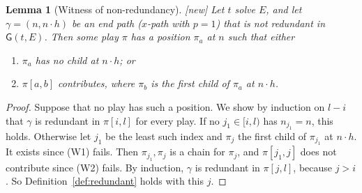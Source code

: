 \documentclass[11pt]{article}
\newcommand{\Gm}{\mathsf{G}}
\newcommand{\suc}[2]{#1{\cdot}#2}
\newcommand{\iv}[2]{\pi[#1,#2]}
\newcommand{\New}{\textsf{[new]}}
\theoremstyle{plain}
\newtheorem{lemma}[theorem]{Lemma}
\theoremstyle{definition}
\theoremstyle{remark}
\begin{document}
\begin{lemma}[Witness of non-redundancy]\label{lem:witness}
\New{} Let $t$ solve $E$, and let $\gamma=(n,\suc nh)$ be an end path
($x$-path with $p=1$) that is not redundant in $\Gm(t,E)$.  Then some
play $\pi$ has a position $\pi_a$ at $n$ such that either
\begin{enumerate}[(W1)]
\item $\pi_a$ has no child at $\suc nh$; or
\item $\iv ab$ contributes, where $\pi_b$ is the first child of
  $\pi_a$ at $\suc nh$.
\end{enumerate}
\end{lemma}
\begin{proof}
Suppose that no play has such a position.  We show by induction on
$l-i$ that $\gamma$ is redundant in $\iv il$ for every play.  If no
$j_1\in[i,l)$ has $n_{j_1}=n$, this holds.  Otherwise let $j_1$ be the
least such index and $\pi_j$ the first child of $\pi_{j_1}$ at $\suc nh$.
It exists since (W1) fails.  Then $\pi_{j_1},\pi_j$ is a chain for
$\pi_j$, and $\iv{j_1}j$ does not contribute since (W2) fails.  By
induction, $\gamma$ is redundant in $\iv jl$, because $j>i$.  So
Definition~\ref{def:redundant} holds with this $j$.
\end{proof}
\end{document}
